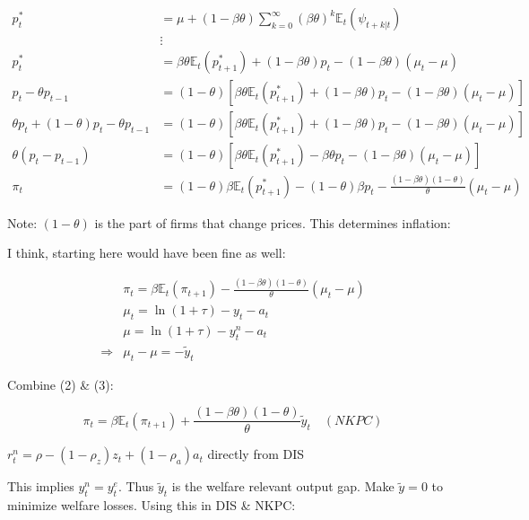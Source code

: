 {\begin{enumerate}[label=(\alph*)]
{$$
\begin{aligned}
p_{t}^{*}&=\mu+(1-\beta \theta) \sum_{k=0}^{\infty}(\beta \theta)^{k} \mathbb{E}_{t}\left(\psi_{t+k |t}\right) \\
&\vdots \\
p_{t}^{*}&=\beta \theta \mathbb{E}_{t}\left(p_{t+1}^{*}\right)+(1-\beta \theta) p_{t}-(1-\beta \theta)\left(\mu_{t}-\mu\right) \\
p_{t}-\theta p_{t-1}&=(1-\theta)\left[\beta \theta \mathbb{E}_{t}\left(p_{t+1}^{*}\right)+(1-\beta \theta) p_{t}-(1-\beta \theta)\left(\mu_{t}-\mu\right)\right]  \\
\theta p_{t}+(1-\theta) p_{t}-\theta p_{t-1}&=(1-\theta)\left[\beta \theta \mathbb{E}_{t}\left(p_{t+1}^{*}\right)+(1-\beta \theta) p_{t}-(1-\beta \theta)\left(\mu_{t}-\mu\right)\right]  \\
\theta\left(p_{t}-p_{t-1}\right)&=(1-\theta)\left[\beta \theta \mathbb{E}_{t}\left(p_{t+1}^{*}\right)-\beta \theta p_{t}-(1-\beta \theta)\left(\mu_{t}-\mu\right)\right] \\
\pi_{t}&=(1-\theta) \beta \mathbb{E}_{t}\left(p_{t+1}^{*}\right)-(1-\theta) \beta p_{t}-\frac{(1-\beta \theta)(1-\theta)}{\theta}\left(\mu_{t}-\mu\right)
\end{aligned}
$$

Note: $(1-\theta)$ is the part of firms that change prices. This determines inflation:

\color{red} I think, starting here would have been fine as well: \color{black}

\begin{align*}
& \pi_{t}=\beta \mathbb{E}_{t}\left(\pi_{t+1}\right)-\frac{(1-\beta \theta)(1-\theta)}{\theta}\left(\mu_{t}-\mu\right)  \tag{2}\\
& \mu_{t}=\ln (1+\tau)-y_{t}-a_{t} \\
& \mu=\ln (1+\tau)-y_{t}^{n}-a_{t} \\
\Rightarrow & \mu_{t}-\mu=-\tilde{y}_{t}  \tag{3}
\end{align*}

Combine (2) \& (3):

$$
\pi_{t}=\beta \mathbb{E}_{t}\left(\pi_{t+1}\right)+\frac{(1-\beta \theta)(1-\theta)}{\theta} \tilde{y}_{t} \quad(N K P C)
$$
}
{
\item 
$r_{t}^{n}=\rho-\left(1-\rho_{z}\right) z_{t}+\left(1-\rho_{a}\right) a_{t}$ directly from DIS
}
{
\item 
This implies $y_{t}^{n}=y_{t}^{e}$. Thus $\tilde{y}_{t}$ is the welfare relevant output gap. Make $\tilde{y}=0$ to minimize welfare losses. Using this in DIS \& NKPC:

}
\end{enumerate}}
